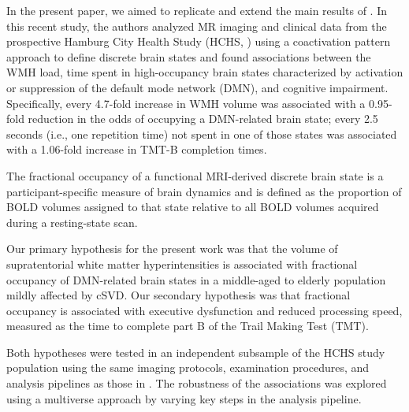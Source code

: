 In the present paper, we aimed to replicate and extend the main results of \citep{Schlemm2022-he}.
In this recent study, the authors analyzed MR imaging and clinical data from the prospective Hamburg City Health Study (HCHS, \citep{Jagodzinski2020-lx}) using a coactivation pattern approach to define discrete brain states and found associations between the WMH load, time spent in high-occupancy brain states characterized by activation or suppression of the default mode network (DMN), and cognitive impairment. 
Specifically, every 4.7-fold increase in WMH volume was associated with a 0.95-fold reduction in the odds of occupying a DMN-related brain state; every 2.5 seconds (i.e., one repetition time) not spent in one of those states was associated with a 1.06-fold increase in TMT-B completion times.

The fractional occupancy of a functional MRI-derived discrete brain state is a participant-specific measure of brain dynamics and is defined as the proportion of BOLD volumes assigned to that state relative to all BOLD volumes acquired during a resting-state scan.

Our primary hypothesis for the present work was that the volume of supratentorial white matter hyperintensities is associated with fractional occupancy of DMN-related brain states in a middle-aged to elderly population mildly affected by cSVD.
Our secondary hypothesis was that fractional occupancy is associated with executive dysfunction and reduced processing speed, measured as the time to complete part B of the Trail Making Test (TMT).

Both hypotheses were tested in an independent subsample of the HCHS study population using the same imaging protocols, examination procedures, and analysis pipelines as those in \citep{Schlemm2022-he}.
The robustness of the associations was explored using a multiverse approach by varying key steps in the analysis pipeline.

